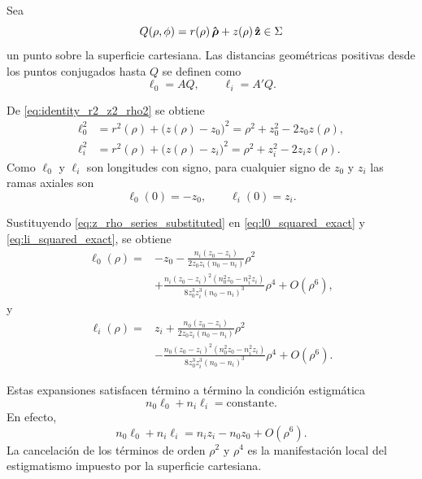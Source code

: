 Sea
\begin{equation}
Q(\rho,\phi)
=
r(\rho)\,\bm{\hat{\mathbf{\rho}}}
+
z(\rho)\,\bm{\hat{\mathbf{z}}}
\in\Sigma
\label{eq:surface_point_Q}
\end{equation}
un punto sobre la superficie cartesiana. Las distancias geométricas positivas desde los puntos conjugados hasta \(Q\) se definen como
\begin{equation}
\ell_0=AQ,
\qquad
\ell_i=A'Q.
\label{eq:geometrical_distances_l0_li}
\end{equation}

De \eqref{eq:identity_r2_z2_rho2} se obtiene
\begin{align}
\ell_0^2
&=
r^2(\rho)+\bigl(z(\rho)-z_0\bigr)^2
=
\rho^2+z_0^2-2z_0z(\rho),
\label{eq:l0_squared_exact}
\\[6pt]
\ell_i^2
&=
r^2(\rho)+\bigl(z(\rho)-z_i\bigr)^2
=
\rho^2+z_i^2-2z_iz(\rho).
\label{eq:li_squared_exact}
\end{align}
Como $\ell_0$ y $\ell_i$ son longitudes con signo, para cualquier signo de
$z_0$ y $z_i$ las ramas axiales son
\begin{equation}
\ell_0(0)=-z_0,
\qquad
\ell_i(0)=z_i.
\label{eq:l0_li_axis_branches}
\end{equation}

Sustituyendo \eqref{eq:z_rho_series_substituted} en \eqref{eq:l0_squared_exact} y \eqref{eq:li_squared_exact}, se obtiene
\begin{align}
\ell_0(\rho)
=
{}&
-z_0
-
\frac{
n_i(z_0-z_i)
}{
2z_0z_i(n_0-n_i)
}
\rho^2
\nonumber
\\[4pt]
&
+
\frac{
n_i(z_0-z_i)^2
(n_0^2z_0-n_i^2z_i)
}{
8z_0^3z_i^3(n_0-n_i)^3
}
\rho^4
+
O(\rho^6),
\label{eq:l0_series_expansion}
\end{align}
y
\begin{align}
\ell_i(\rho)
=
{}&
z_i
+
\frac{
n_0(z_0-z_i)
}{
2z_0z_i(n_0-n_i)
}
\rho^2
\nonumber
\\[4pt]
&
-
\frac{
n_0(z_0-z_i)^2
(n_0^2z_0-n_i^2z_i)
}{
8z_0^3z_i^3(n_0-n_i)^3
}
\rho^4
+
O(\rho^6).
\label{eq:li_series_expansion}
\end{align}

Estas expansiones satisfacen término a término la condición estigmática
\begin{equation}
n_0\ell_0+n_i\ell_i
=
\text{constante}.
\label{eq:cartesian_optical_path_condition}
\end{equation}
En efecto,
\begin{equation}
n_0\ell_0+n_i\ell_i
=
n_iz_i-n_0z_0
+
O(\rho^6).
\label{eq:optical_path_constant_local}
\end{equation}
La cancelación de los términos de orden \(\rho^2\) y \(\rho^4\) es la manifestación local del estigmatismo impuesto por la superficie cartesiana.

